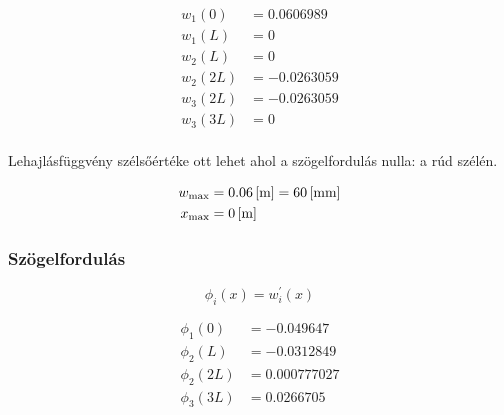 \begin{align*}
	w_1(0) &= 0.0606989 \\
	w_1(L) &= 0 \\
	w_2(L) &= 0 \\
	w_2(2L) &= -0.0263059 \\
	w_3(2L) &= -0.0263059 \\
	w_3(3L) &= 0 \\
\end{align*}

Lehajlásfüggvény szélsőértéke ott lehet ahol a szögelfordulás nulla: a rúd szélén.

\begin{align*}
	w_{\text{max}} &= \m{0.06} = \mm{60} \\
	x_{\text{max}} &= \m{0}
\end{align*}

\subsubsection{Szögelfordulás}

\begin{equation*}
	\phi_i(x) = w_i^{'}(x)
\end{equation*}

\begin{align*}
	\phi_1(0) &= -0.049647 \\
	\phi_2(L) &= -0.0312849 \\
	\phi_2(2L) &= 0.000777027 \\
	\phi_3(3L) &= 0.0266705
\end{align*}
